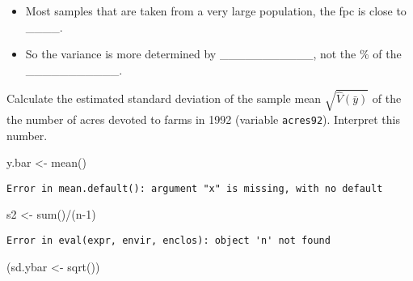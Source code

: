 \documentclass[
  letterpaper,
  DIV=11,
  numbers=noendperiod]{scrartcl}
\newenvironment{Shaded}{}{}
\newcommand{\DecValTok}[1]{\textcolor[rgb]{0.00,0.36,0.77}{#1}}
\newcommand{\FunctionTok}[1]{\textcolor[rgb]{0.44,0.26,0.76}{#1}}
\newcommand{\NormalTok}[1]{\textcolor[rgb]{0.14,0.16,0.18}{#1}}
\newcommand{\OtherTok}[1]{\textcolor[rgb]{0.44,0.26,0.76}{#1}}
\newcommand{\SpecialCharTok}[1]{\textcolor[rgb]{0.00,0.36,0.77}{#1}}
\providecommand{\tightlist}{%
  \setlength{\itemsep}{0pt}\setlength{\parskip}{0pt}}\usepackage{longtable,booktabs,array}
\begin{document}
\begin{itemize}
\tightlist
\item
  Most samples that are taken from a very large population, the fpc is
  close to \_\_\_\_.
\item
  So the variance is more determined by \_\_\_\_\_\_\_\_\_\_\_, not the
  \% of the \_\_\_\_\_\_\_\_\_\_\_.
\end{itemize}

\begin{tcolorbox}[enhanced jigsaw, toptitle=1mm, breakable, colframe=quarto-callout-tip-color-frame, colbacktitle=quarto-callout-tip-color!10!white, left=2mm, titlerule=0mm, bottomtitle=1mm, title=\textcolor{quarto-callout-tip-color}{\faLightbulb}\hspace{0.5em}{Example}, bottomrule=.15mm, rightrule=.15mm, arc=.35mm, toprule=.15mm, colback=white, opacityback=0, leftrule=.75mm, coltitle=black, opacitybacktitle=0.6]

Calculate the estimated standard deviation of the sample mean
\(\sqrt{\hat{V}(\bar{y})}\) of the the number of acres devoted to farms
in 1992 (variable \texttt{acres92}). Interpret this number.

\end{tcolorbox}

\begin{Shaded}
\begin{Highlighting}[]
\NormalTok{y.bar }\OtherTok{\textless{}{-}} \FunctionTok{mean}\NormalTok{()}
\end{Highlighting}
\end{Shaded}

\begin{verbatim}
Error in mean.default(): argument "x" is missing, with no default
\end{verbatim}

\begin{Shaded}
\begin{Highlighting}[]
\NormalTok{s2 }\OtherTok{\textless{}{-}} \FunctionTok{sum}\NormalTok{()}\SpecialCharTok{/}\NormalTok{(n}\DecValTok{{-}1}\NormalTok{)}
\end{Highlighting}
\end{Shaded}

\begin{verbatim}
Error in eval(expr, envir, enclos): object 'n' not found
\end{verbatim}

\begin{Shaded}
\begin{Highlighting}[]
\NormalTok{(sd.ybar }\OtherTok{\textless{}{-}} \FunctionTok{sqrt}\NormalTok{())}
\end{Highlighting}
\end{Shaded}
\end{document}
